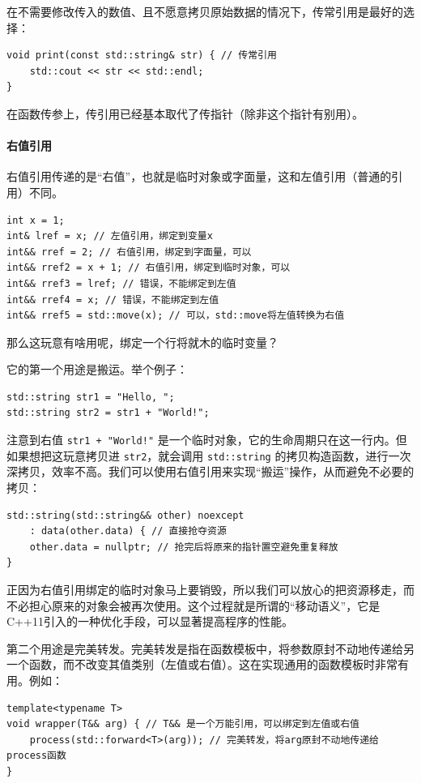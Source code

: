 在不需要修改传入的数值、且不愿意拷贝原始数据的情况下，传常引用是最好的选择：
\begin{verbatim}
void print(const std::string& str) { // 传常引用
    std::cout << str << std::endl;
}
\end{verbatim}

在函数传参上，传引用已经基本取代了传指针（除非这个指针有别用）。

\paragraph{右值引用} 

右值引用传递的是“右值”，也就是临时对象或字面量，这和左值引用（普通的引用）不同。
\begin{verbatim}
int x = 1;
int& lref = x; // 左值引用，绑定到变量x
int&& rref = 2; // 右值引用，绑定到字面量，可以
int&& rref2 = x + 1; // 右值引用，绑定到临时对象，可以
int&& rref3 = lref; // 错误，不能绑定到左值
int&& rref4 = x; // 错误，不能绑定到左值
int&& rref5 = std::move(x); // 可以，std::move将左值转换为右值
\end{verbatim}

那么这玩意有啥用呢，绑定一个行将就木的临时变量？

它的第一个用途是搬运。举个例子：
\begin{verbatim}
std::string str1 = "Hello, ";
std::string str2 = str1 + "World!";
\end{verbatim}
注意到右值 \verb|str1 + "World!"| 是一个临时对象，它的生命周期只在这一行内。但如果想把这玩意拷贝进 \verb|str2|，就会调用 \verb|std::string| 的拷贝构造函数，进行一次深拷贝，效率不高。我们可以使用右值引用来实现“搬运”操作，从而避免不必要的拷贝：
\begin{verbatim}
std::string(std::string&& other) noexcept 
    : data(other.data) { // 直接抢夺资源
    other.data = nullptr; // 抢完后将原来的指针置空避免重复释放
}
\end{verbatim}
正因为右值引用绑定的临时对象马上要销毁，所以我们可以放心的把资源移走，而不必担心原来的对象会被再次使用。这个过程就是所谓的“移动语义”，它是C++11引入的一种优化手段，可以显著提高程序的性能。

第二个用途是完美转发。完美转发是指在函数模板中，将参数原封不动地传递给另一个函数，而不改变其值类别（左值或右值）。这在实现通用的函数模板时非常有用。例如：
\begin{verbatim}
template<typename T>
void wrapper(T&& arg) { // T&& 是一个万能引用，可以绑定到左值或右值
    process(std::forward<T>(arg)); // 完美转发，将arg原封不动地传递给process函数
}
\end{verbatim}

